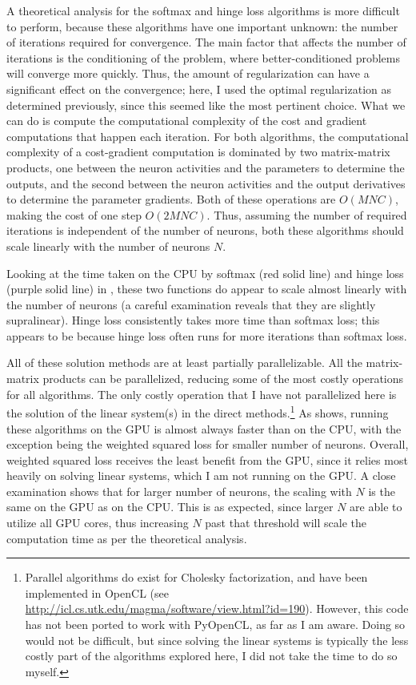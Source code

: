 A theoretical analysis for the softmax and hinge loss algorithms
is more difficult to perform,
because these algorithms have one important unknown:
the number of iterations required for convergence.
The main factor that affects the number of iterations
is the conditioning of the problem,
where better-conditioned problems will converge more quickly.
Thus, the amount of regularization can have a significant effect
on the convergence;
here, I used the optimal regularization as determined previously,
since this seemed like the most pertinent choice.
What we can do is compute the computational complexity
of the cost and gradient computations that happen each iteration.
For both algorithms,
the computational complexity of a cost-gradient computation
is dominated by two matrix-matrix products,
one between the neuron activities and the parameters to determine the outputs,
and the second between the neuron activities and the output derivatives
to determine the parameter gradients.
Both of these operations are $O(MNC)$,
making the cost of one step $O(2MNC)$.
Thus, assuming the number of required iterations
is independent of the number of neurons,
both these algorithms should scale linearly with the number of neurons $N$.

Looking at the time taken on the CPU by softmax (red solid line)
and hinge loss (purple solid line) in ,
these two functions do appear to scale almost linearly
with the number of neurons
(a careful examination reveals that they are slightly supralinear).
Hinge loss consistently takes more time than softmax loss;
this appears to be because hinge loss often runs for more iterations
than softmax loss.

All of these solution methods are at least partially parallelizable.
All the matrix-matrix products can be parallelized,
reducing some of the most costly operations for all algorithms.
The only costly operation that I have not parallelized here
is the solution of the linear system(s) in the direct methods.\footnote{
  Parallel algorithms do exist for Cholesky factorization,
  and have been implemented in OpenCL
  (see \url{http://icl.cs.utk.edu/magma/software/view.html?id=190}).
  However, this code has not been ported to work with PyOpenCL,
  as far as I am aware.
  Doing so would not be difficult,
  but since solving the linear systems is typically the less costly part
  of the algorithms explored here,
  I did not take the time to do so myself.}
As  shows,
running these algorithms on the GPU is almost always faster than on the CPU,
with the exception being the weighted squared loss for smaller number of neurons.
Overall, weighted squared loss receives the least benefit from the GPU,
since it relies most heavily on solving linear systems,
which I am not running on the GPU.
A close examination shows that for larger number of neurons,
the scaling with $N$ is the same on the GPU as on the CPU.
This is as expected, since larger $N$ are able to utilize all GPU cores,
thus increasing $N$ past that threshold will scale the computation time
as per the theoretical analysis.

